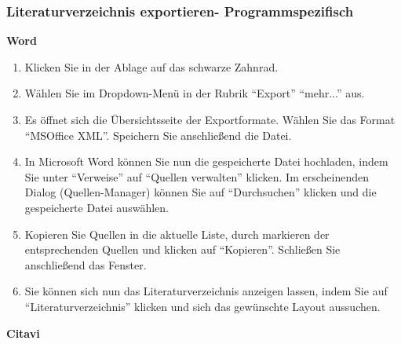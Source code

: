 \documentclass[b5paper,11pt,twoside]{scrbook} %
\begin{document}
\subsubsection{Literaturverzeichnis exportieren- Programmspezifisch}
\textbf{Word} 
\begin{enumerate}
    \item Klicken Sie in der Ablage auf das schwarze Zahnrad.
    \item Wählen Sie im Dropdown-Menü in der Rubrik \enquote{Export} \enquote{mehr...} aus.
    \item Es öffnet sich die Übersichtsseite der Exportformate. Wählen Sie das Format \enquote{MSOffice XML}. Speichern Sie anschließend die Datei.
    \item In Microsoft Word können Sie nun die gespeicherte Datei hochladen, indem Sie unter \enquote{Verweise} auf \enquote{Quellen verwalten} klicken. Im erscheinenden Dialog (Quellen-Manager) können Sie auf \enquote{Durchsuchen} klicken und die gespeicherte Datei auswählen. 
    \item Kopieren Sie Quellen in die aktuelle Liste, durch markieren der entsprechenden Quellen und klicken auf \enquote{Kopieren}. Schließen Sie anschließend das Fenster.
    \item Sie können sich nun das Literaturverzeichnis anzeigen lassen, indem Sie auf \enquote{Literaturverzeichnis} klicken und sich das gewünschte Layout aussuchen.
\end{enumerate}
\textbf{Citavi}
\end{document}
